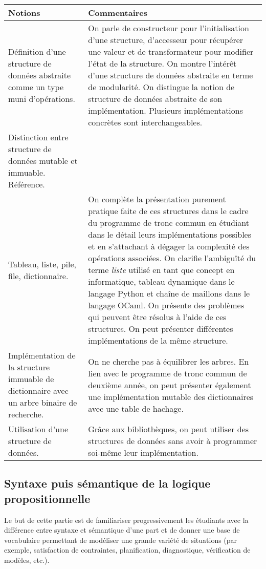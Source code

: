 \begin{longtable}{|p{\lnotion}|p{\comment}|}
    \hline
    \textbf{Notions} & \textbf{Commentaires} \\
    \hline\hline
    Définition d’une structure de données
    abstraite comme un type muni d'opérations. &
On parle de constructeur pour l'initialisation d'une structure, d'accesseur pour récupérer une valeur et de transformateur pour modifier l'état de la structure. On montre l'intérêt d'une structure de données abstraite en terme de modularité. On distingue la notion de structure de données abstraite de son implémentation. Plusieurs implémentations concrètes sont interchangeables.
                                                      \\ \hline
    Distinction entre structure de données mutable et immuable. Référence. &\\ 
    \hline
    Tableau, liste, pile, file, dictionnaire. 
    & On complète la présentation purement pratique faite de ces structures dans le cadre du programme de tronc commun en étudiant dans le détail leurs implémentations possibles et en s'attachant à dégager la complexité des opérations associées. On clarifie l'ambiguïté du terme \emph{liste} utilisé en tant que concept en informatique, tableau dynamique dans le langage Python et chaîne de maillons dans le langage OCaml. On présente des problèmes qui peuvent être résolus à l'aide de ces structures.
    On peut présenter différentes implémentations de la même structure.
    \\
    \hline
    Implémentation de la structure immuable de
    dictionnaire avec un arbre binaire de recherche. & On ne cherche pas à équilibrer les arbres. En lien avec le programme de tronc commun de deuxième année, on peut présenter également une implémentation mutable des dictionnaires avec une table de hachage.\\
    \hline
    Utilisation d'une structure de données. & Grâce aux bibliothèques, on peut utiliser des structures de données sans avoir à programmer soi-même leur implémentation.\\ \hline 
\end{longtable} 

\subsection{Syntaxe puis sémantique de la logique propositionnelle}

Le but de cette partie est de familiariser progressivement les étudiants avec
la différence entre syntaxe et sémantique d'une part et de donner une base de 
vocabulaire permettant de modéliser une grande variété de situations (par
exemple, satisfaction de contraintes, planification, diagnostique, vérification
de modèles, etc.).

